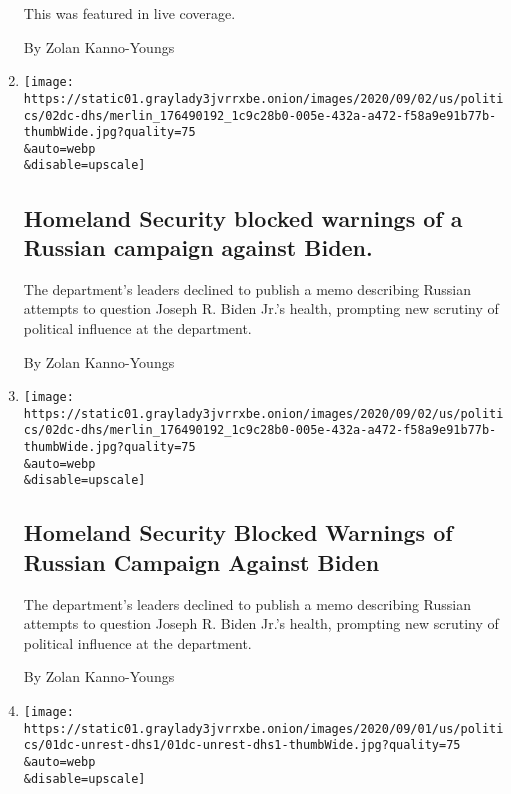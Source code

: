 \begin{enumerate}
  This was featured in live coverage.

  By Zolan Kanno-Youngs
\item
  \href{/2020/09/03/us/elections/homeland-security-blocked-warnings-of-a-russian-campaign-against-biden.html}{}

  \texttt{[image: https://static01.graylady3jvrrxbe.onion/images/2020/09/02/us/politics/02dc-dhs/merlin\_176490192\_1c9c28b0-005e-432a-a472-f58a9e91b77b-thumbWide.jpg?quality=75\\\&auto=webp\\\&disable=upscale]}

  \hypertarget{homeland-security-blocked-warnings-of-a-russian-campaign-against-biden}{%
  \subsection{Homeland Security blocked warnings of a Russian campaign
  against
  Biden.}\label{homeland-security-blocked-warnings-of-a-russian-campaign-against-biden}}

  The department's leaders declined to publish a memo describing Russian
  attempts to question Joseph R. Biden Jr.'s health, prompting new
  scrutiny of political influence at the department.

  By Zolan Kanno-Youngs
\item
  \href{/2020/09/02/us/politics/trump-biden-russia-election.html}{}

  \texttt{[image: https://static01.graylady3jvrrxbe.onion/images/2020/09/02/us/politics/02dc-dhs/merlin\_176490192\_1c9c28b0-005e-432a-a472-f58a9e91b77b-thumbWide.jpg?quality=75\\\&auto=webp\\\&disable=upscale]}

  \hypertarget{homeland-security-blocked-warnings-of-russian-campaign-against-biden}{%
  \subsection{Homeland Security Blocked Warnings of Russian Campaign
  Against
  Biden}\label{homeland-security-blocked-warnings-of-russian-campaign-against-biden}}

  The department's leaders declined to publish a memo describing Russian
  attempts to question Joseph R. Biden Jr.'s health, prompting new
  scrutiny of political influence at the department.

  By Zolan Kanno-Youngs
\item
  \href{/2020/09/01/us/politics/trump-homeland-security-extremism.html}{}

  \texttt{[image: https://static01.graylady3jvrrxbe.onion/images/2020/09/01/us/politics/01dc-unrest-dhs1/01dc-unrest-dhs1-thumbWide.jpg?quality=75\\\&auto=webp\\\&disable=upscale]}


\end{enumerate}
